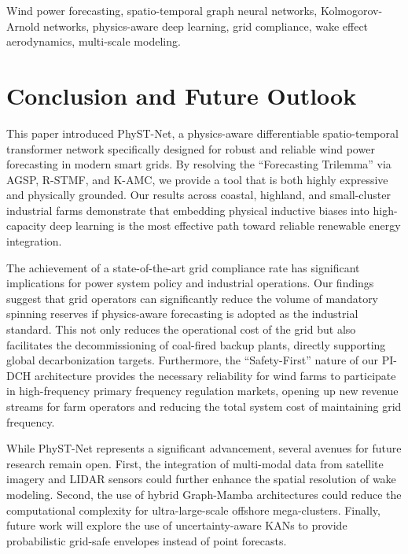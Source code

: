 \documentclass[lettersize,journal]{IEEEtran}
\begin{document}
\begin{IEEEkeywords}
Wind power forecasting, spatio-temporal graph neural networks, Kolmogorov-Arnold networks, physics-aware deep learning, grid compliance, wake effect aerodynamics, multi-scale modeling.
\end{IEEEkeywords}









\section{Conclusion and Future Outlook}
\label{sec:conclusion}
This paper introduced PhyST-Net, a physics-aware differentiable spatio-temporal transformer network specifically designed for robust and reliable wind power forecasting in modern smart grids. By resolving the ``Forecasting Trilemma'' via AGSP, R-STMF, and K-AMC, we provide a tool that is both highly expressive and physically grounded. Our results across coastal, highland, and small-cluster industrial farms demonstrate that embedding physical inductive biases into high-capacity deep learning is the most effective path toward reliable renewable energy integration.

The achievement of a state-of-the-art grid compliance rate has significant implications for power system policy and industrial operations. Our findings suggest that grid operators can significantly reduce the volume of mandatory spinning reserves if physics-aware forecasting is adopted as the industrial standard. This not only reduces the operational cost of the grid but also facilitates the decommissioning of coal-fired backup plants, directly supporting global decarbonization targets. Furthermore, the ``Safety-First'' nature of our PI-DCH architecture provides the necessary reliability for wind farms to participate in high-frequency primary frequency regulation markets, opening up new revenue streams for farm operators and reducing the total system cost of maintaining grid frequency.

While PhyST-Net represents a significant advancement, several avenues for future research remain open. First, the integration of multi-modal data from satellite imagery and LIDAR sensors could further enhance the spatial resolution of wake modeling. Second, the use of hybrid Graph-Mamba architectures could reduce the computational complexity for ultra-large-scale offshore mega-clusters. Finally, future work will explore the use of uncertainty-aware KANs to provide probabilistic grid-safe envelopes instead of point forecasts.
\end{document}
